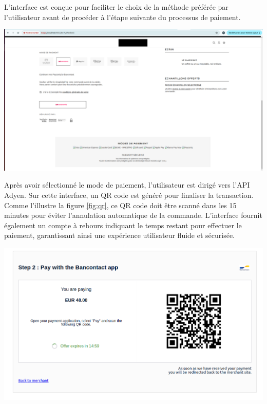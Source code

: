 L'interface est conçue pour faciliter le choix de la méthode préférée par l'utilisateur avant de procéder à l'étape suivante du processus de paiement.
\begin{center}
    \centering
    \includegraphics[width=19cm]{Figures/Screens/payment.png}
    \label{fig:mode_paiement}
\end{center}
Après avoir sélectionné le mode de paiement, l'utilisateur est dirigé vers l'API Adyen. Sur cette interface, un QR code est généré pour finaliser la transaction. Comme l'illustre la figure \ref{fig:qr}, ce QR code doit être scanné dans les 15 minutes pour éviter l'annulation automatique de la commande. L'interface fournit également un compte à rebours indiquant le temps restant pour effectuer le paiement, garantissant ainsi une expérience utilisateur fluide et sécurisée.
\begin{center}
    \centering
    \includegraphics[width=19cm]{Figures/Screens/redirection.png}
    \label{fig:qr}
\end{center}
